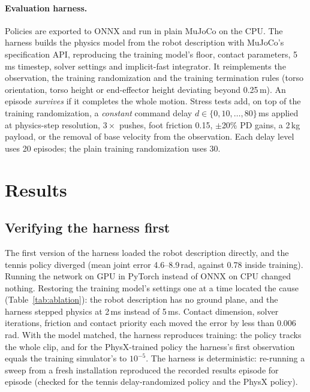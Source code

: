 \documentclass{l4dc2026}
\begin{document}
\paragraph{Evaluation harness.}
Policies are exported to ONNX and run in plain MuJoCo on the CPU.
The harness builds the physics model from the robot description with MuJoCo's specification API, reproducing the training model's floor, contact parameters, 5\,ms timestep, solver settings and implicit-fast integrator.
It reimplements the observation, the training randomization and the training termination rules (torso orientation, torso height or end-effector height deviating beyond 0.25\,m).
An episode \emph{survives} if it completes the whole motion.
Stress tests add, on top of the training randomization, a \emph{constant} command delay $d\in\{0,10,\dots,80\}$\,ms applied at physics-step resolution, $3\times$ pushes, foot friction 0.15, $\pm$20\% PD gains, a 2\,kg payload, or the removal of base velocity from the observation.
Each delay level uses 20 episodes; the plain training randomization uses 30.

\section{Results}

\subsection{Verifying the harness first}
\label{sec:harness}

The first version of the harness loaded the robot description directly, and the tennis policy diverged (mean joint error 4.6--8.9\,rad, against 0.78 inside training).
Running the network on GPU in PyTorch instead of ONNX on CPU changed nothing.
Restoring the training model's settings one at a time located the cause (Table~\ref{tab:ablation}): the robot description has no ground plane, and the harness stepped physics at 2\,ms instead of 5\,ms.
Contact dimension, solver iterations, friction and contact priority each moved the error by less than 0.006\,rad.
With the model matched, the harness reproduces training: the policy tracks the whole clip, and for the PhysX-trained policy the harness's first observation equals the training simulator's to $10^{-5}$.
The harness is deterministic: re-running a sweep from a fresh installation reproduced the recorded results episode for episode (checked for the tennis delay-randomized policy and the PhysX policy).
\end{document}
